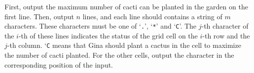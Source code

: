 First, output the maximum number of cacti can be planted in the garden on the
first line. Then, output $n$ lines, and each line should contains a string of 
$m$ characters.
These characters must be one of `\verb+.+', `\verb+*+' and `\verb+C+'.
The $j$-th character of the $i$-th of these lines indicates the status of
the grid cell on the $i$-th row and the $j$-th column.
`\verb+C+ means that Gina should plant a cactus in the cell to maximize the
number of cacti planted.
For the other cells, output the character in the corresponding position of the
input.
